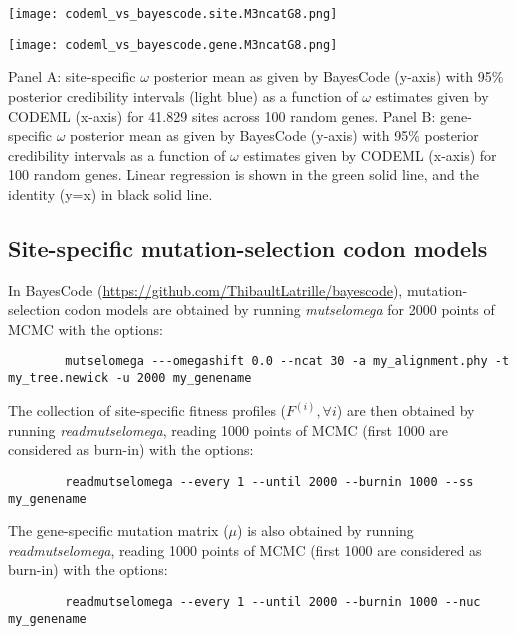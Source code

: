 \documentclass{article}
\renewcommand*{\bm}[1]{#1}%
\newcommand{\UniDimArray}[1]{\bm{#1}}
\begin{document}
    \begin{center}
        \begin{minipage}{0.49\linewidth}
            \texttt{[image: codeml\_vs\_bayescode.site.M3ncatG8.png]}
        \end{minipage}
        \hfill
        \begin{minipage}{0.49\linewidth}
            \texttt{[image: codeml\_vs\_bayescode.gene.M3ncatG8.png]}
        \end{minipage}
        \hfill
    \end{center}
    Panel A: site-specific $\omega$ posterior mean as given by BayesCode (y-axis) with 95\% posterior credibility intervals (light blue) as a function of  $\omega$ estimates given by CODEML (x-axis) for 41.829 sites across 100 random genes.
    Panel B: gene-specific $\omega$ posterior mean as given by BayesCode (y-axis) with 95\% posterior credibility intervals  as a function of $\omega$ estimates given by CODEML (x-axis) for 100 random genes.
    Linear regression is shown in the green solid line, and the identity (y=x) in black solid line.

    \subsection{Site-specific mutation-selection codon models}

    In BayesCode (\url{https://github.com/ThibaultLatrille/bayescode}), mutation-selection codon models are obtained by running \textit{mutselomega} for 2000 points of MCMC with the options:
    \begin{scriptsize}
        \begin{verbatim}
        mutselomega ---omegashift 0.0 --ncat 30 -a my_alignment.phy -t my_tree.newick -u 2000 my_genename
        \end{verbatim}
    \end{scriptsize}
    The collection of site-specific fitness profiles ($\UniDimArray{F^{(i)}}, \forall i$) are then obtained by running \textit{readmutselomega}, reading 1000 points of MCMC (first 1000 are considered as burn-in) with the options:
    \begin{scriptsize}
        \begin{verbatim}
        readmutselomega --every 1 --until 2000 --burnin 1000 --ss my_genename
        \end{verbatim}
    \end{scriptsize}
    The gene-specific mutation matrix ($\UniDimArray{\mu}$) is also obtained by running \textit{readmutselomega}, reading 1000 points of MCMC (first 1000 are considered as burn-in) with the options:
    \begin{scriptsize}
        \begin{verbatim}
        readmutselomega --every 1 --until 2000 --burnin 1000 --nuc my_genename
        \end{verbatim}
    \end{scriptsize}
\end{document}
